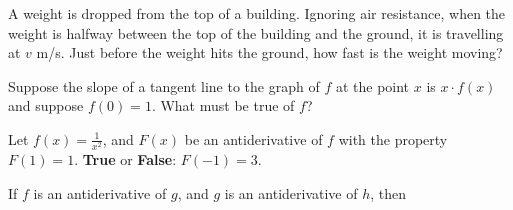 \documentclass{ximera}
\newcommand{\recommendation}[1]{}
\newcommand{\GoodQuestions}[1]{}
\begin{document}
\begin{problem}
  A weight is dropped from the top of a building.  Ignoring air
  resistance, when the weight is halfway between the top of the
  building and the ground, it is travelling at $v$ m/s.  Just before
  the weight hits the ground, how fast is the weight moving?
  \begin{multipleChoice}
  \end{multipleChoice}
\end{problem}



\begin{problem}
  Suppose the slope of a tangent line to the graph of $f$ at the point $x$ is $x \cdot f(x)$ and suppose $f(0) = 1$.  What must be true of $f$?
  \begin{multipleChoice}
  \end{multipleChoice}
\end{problem}



\begin{problem}
  \recommendation{Vic}
  \GoodQuestions{Subject: Antiderivatives 2P}

  Let $f(x)=\frac{1}{x^2}$, and $F(x)$ be an antiderivative of $f$
  with the property $F(1)=1$.  {\bf True} or
  \textbf{False}: $F(-1)=3$.
  \begin{multipleChoice}
  \end{multipleChoice}
\end{problem}


\begin{problem}
  \recommendation{Vic}
  \GoodQuestions{Subject: Antiderivatives 3Q}

  If $f$ is an antiderivative of $g$, and $g$ is an antiderivative of
  $h$, then
  \begin{multipleChoice}
  \end{multipleChoice}
\end{problem}
\end{document}

